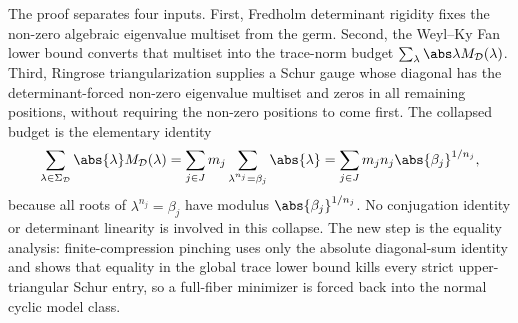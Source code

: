 The proof separates four inputs.  First, Fredholm determinant rigidity fixes
the non-zero algebraic eigenvalue multiset from the germ.  Second, the
Weyl--Ky Fan lower bound converts that multiset into the trace-norm budget
\(\sum_{\lambda}\abs\lambda M_{\mathcal D}(\lambda)\). Third, Ringrose
triangularization supplies a Schur gauge whose diagonal has the
determinant-forced non-zero eigenvalue multiset and zeros in all remaining
positions, without requiring the non-zero positions to come first.
  The collapsed budget is the elementary identity
  \[
    \sum_{\lambda\in\Sigma_{\mathcal D}}\abs{\lambda}M_{\mathcal D}(\lambda)
    =\sum_{j\in J}m_j\sum_{\lambda^{n_j}=\beta_j}\abs{\lambda}
    =\sum_{j\in J}m_jn_j\abs{\beta_j}^{1/n_j},
  \]
  because all roots of \(\lambda^{n_j}=\beta_j\) have modulus
  \(\abs{\beta_j}^{1/n_j}\).  No conjugation identity or determinant linearity is
  involved in this collapse. The new step is the equality analysis:
  finite-compression pinching uses only the absolute diagonal-sum identity and
  shows that equality in the global trace lower bound kills every strict
  upper-triangular Schur entry, so a full-fiber minimizer is forced back into the
  normal cyclic model class.

